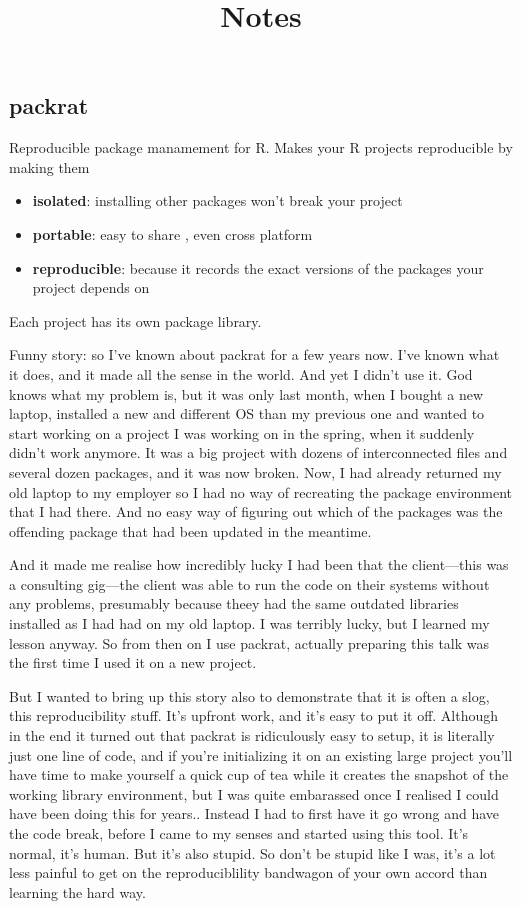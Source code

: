 \documentclass[]{article}
\title{Notes}
\author{}
\date{}
\providecommand{\tightlist}{%
  \setlength{\itemsep}{0pt}\setlength{\parskip}{0pt}}
\begin{document}
\maketitle

\hypertarget{packrat}{%
\subsection{packrat}\label{packrat}}

Reproducible package manamement for R. Makes your R projects
reproducible by making them

\begin{itemize}
\tightlist
\item
  \textbf{isolated}: installing other packages won't break your project
\item
  \textbf{portable}: easy to share , even cross platform
\item
  \textbf{reproducible}: because it records the exact versions of the
  packages your project depends on
\end{itemize}

Each project has its own package library.

Funny story: so I've known about packrat for a few years now. I've known
what it does, and it made all the sense in the world. And yet I didn't
use it. God knows what my problem is, but it was only last month, when I
bought a new laptop, installed a new and different OS than my previous
one and wanted to start working on a project I was working on in the
spring, when it suddenly didn't work anymore. It was a big project with
dozens of interconnected files and several dozen packages, and it was
now broken. Now, I had already returned my old laptop to my employer so
I had no way of recreating the package environment that I had there. And
no easy way of figuring out which of the packages was the offending
package that had been updated in the meantime.

And it made me realise how incredibly lucky I had been that the
client---this was a consulting gig---the client was able to run the code
on their systems without any problems, presumably because theey had the
same outdated libraries installed as I had had on my old laptop. I was
terribly lucky, but I learned my lesson anyway. So from then on I use
packrat, actually preparing this talk was the first time I used it on a
new project.

But I wanted to bring up this story also to demonstrate that it is often
a slog, this reproducibility stuff. It's upfront work, and it's easy to
put it off. Although in the end it turned out that packrat is
ridiculously easy to setup, it is literally just one line of code, and
if you're initializing it on an existing large project you'll have time
to make yourself a quick cup of tea while it creates the snapshot of the
working library environment, but I was quite embarassed once I realised
I could have been doing this for years.. Instead I had to first have it
go wrong and have the code break, before I came to my senses and started
using this tool. It's normal, it's human. But it's also stupid. So don't
be stupid like I was, it's a lot less painful to get on the
reproduciblility bandwagon of your own accord than learning the hard
way.
\end{document}
